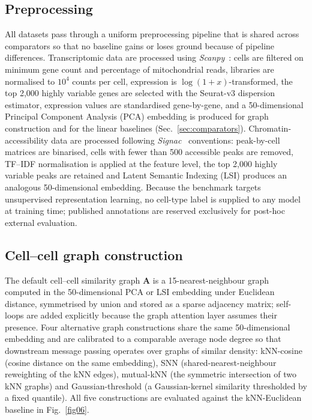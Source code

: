\documentclass[referee, pdflatex, sn-vancouver-num]{sn-jnl}
\begin{document}
\subsection{Preprocessing}\label{sec:preprocess}

All datasets pass through a uniform preprocessing pipeline that is shared across comparators so that no baseline gains or loses ground because of pipeline differences. Transcriptomic data are processed using \textit{Scanpy}~\cite{wolf2018scanpy}: cells are filtered on minimum gene count and percentage of mitochondrial reads, libraries are normalised to $10^{4}$ counts per cell, expression is $\log(1+x)$-transformed, the top 2{,}000 highly variable genes are selected with the Seurat-v3 dispersion estimator, expression values are standardised gene-by-gene, and a 50-dimensional Principal Component Analysis (PCA) embedding is produced for graph construction and for the linear baselines (Sec.~\ref{sec:comparators}). Chromatin-accessibility data are processed following \textit{Signac}~\cite{stuart2021atac} conventions: peak-by-cell matrices are binarised, cells with fewer than 500 accessible peaks are removed, TF--IDF normalisation is applied at the feature level, the top 2{,}000 highly variable peaks are retained and Latent Semantic Indexing (LSI) produces an analogous 50-dimensional embedding. Because the benchmark targets unsupervised representation learning, no cell-type label is supplied to any model at training time; published annotations are reserved exclusively for post-hoc external evaluation.

\subsection{Cell--cell graph construction}\label{sec:graphs}

The default cell--cell similarity graph $\mathbf{A}$ is a 15-nearest-neighbour graph computed in the 50-dimensional PCA or LSI embedding under Euclidean distance, symmetrised by union and stored as a sparse adjacency matrix; self-loops are added explicitly because the graph attention layer assumes their presence. Four alternative graph constructions share the same 50-dimensional embedding and are calibrated to a comparable average node degree so that downstream message passing operates over graphs of similar density: kNN-cosine (cosine distance on the same embedding), SNN (shared-nearest-neighbour reweighting of the kNN edges), mutual-kNN (the symmetric intersection of two kNN graphs) and Gaussian-threshold (a Gaussian-kernel similarity thresholded by a fixed quantile). All five constructions are evaluated against the kNN-Euclidean baseline in Fig.~\ref{fig06}.
\end{document}
